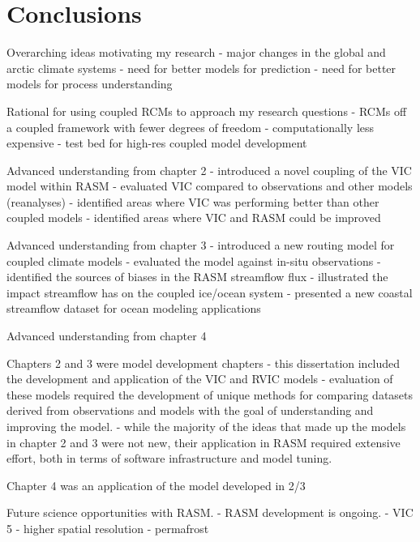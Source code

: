 \chapter {Conclusions}
\label{chap:conclusions}

Overarching ideas motivating my research
  - major changes in the global and arctic climate systems
  - need for better models for prediction
  - need for better models for process understanding

Rational for using coupled RCMs to approach my research questions
  - RCMs off a coupled framework with fewer degrees of freedom
  - computationally less expensive
  - test bed for high-res coupled model development

Advanced understanding from chapter 2
  - introduced a novel coupling of the VIC model within RASM
  - evaluated VIC compared to observations and other models (reanalyses)
  - identified areas where VIC was performing better than other coupled models
  - identified areas where VIC and RASM could be improved

Advanced understanding from chapter 3
  - introduced a new routing model for coupled climate models
  - evaluated the model against in-situ observations
  - identified the sources of biases in the RASM streamflow flux
  - illustrated the impact streamflow has on the coupled ice/ocean system
  - presented a new coastal streamflow dataset for ocean modeling applications

Advanced understanding from chapter 4

Chapters 2 and 3 were model development chapters
  - this dissertation included the development and application of the VIC and RVIC models
  - evaluation of these models required the development of unique methods for comparing datasets derived from observations and models with the goal of understanding and improving the model.
  - while the majority of the ideas that made up the models in chapter 2 and 3 were not new, their application in RASM required extensive effort, both in terms of software infrastructure and model tuning.

Chapter 4 was an application of the model developed in 2/3

Future science opportunities with RASM.
  - RASM development is ongoing.
  - VIC 5
  - higher spatial resolution
  - permafrost

